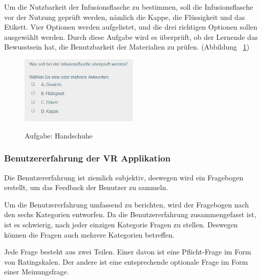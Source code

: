 \begin{enumerate}
    Um die Nutzbarkeit der Infusionsflasche zu bestimmen, soll die Infusionsflasche vor der Nutzung geprüft werden, nämlich die Kappe, die Flüssigkeit und das Etikett. Vier Optionen werden aufgelistet, und die drei richtigen Optionen sollen ausgewählt werden. Durch diese Aufgabe wird es überprüft, ob der Lernende das Bewusstsein hat, die Benutzbarkeit der Materialien zu prüfen. (Abbildung ~\ref{fig:Aufgabe5})
    
\begin{figure}[ht]
\vspace*{1em}
\centering
\caption{Aufgabe: Handschuhe}
\includegraphics[width= 0.5\textwidth]{images/Aufgabe5.png}
\label{fig:Aufgabe5} 
\end{figure}
    
\end{enumerate}

\subsubsection{Benutzererfahrung der VR Applikation}

Die Benutzererfahrung ist ziemlich subjektiv, deswegen wird ein Fragebogen erstellt, um das Feedback der Benutzer zu sammeln.

Um die Benutzererfahrung umfassend zu berichten, wird der Fragebogen nach den sechs Kategorien \citep{28} entworfen. Da die Benutzererfahrung zusammengefasst ist, ist es schwierig, nach jeder einzigen Kategorie Fragen zu stellen. Deswegen können die Fragen auch mehrere Kategorien betreffen.

Jede Frage besteht aus zwei Teilen. Einer davon ist eine Pflicht-Frage im Form von Ratingskalen. Der andere ist eine entsprechende optionale Frage im Form einer Meinungsfrage.

